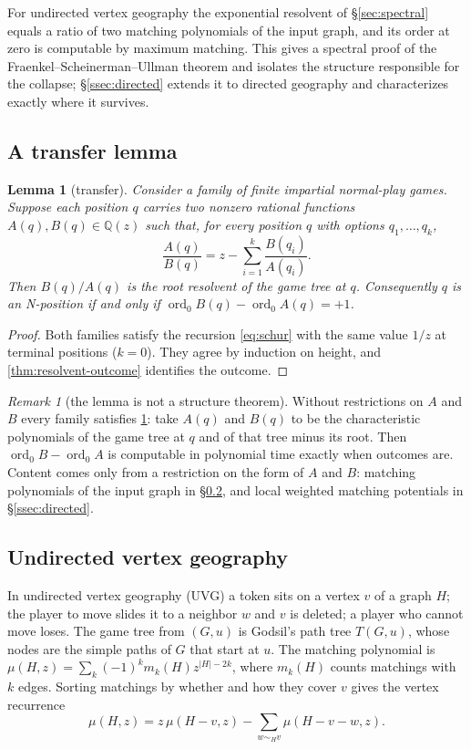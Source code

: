 \documentclass[11pt]{amsart}
\theoremstyle{plain}
\newtheorem{lemma}[theorem]{Lemma}
\theoremstyle{definition}
\theoremstyle{remark}
\newtheorem*{remark*}{Remark}
\numberwithin{equation}{section}
\newcommand{\QQ}{\mathbb{Q}}
\newcommand{\Qz}{\QQ(z)}
\newcommand{\ord}{\operatorname{ord}}
\begin{document}
For undirected vertex geography the exponential resolvent of \S\ref{sec:spectral} equals a ratio of two matching polynomials of the input graph, and its order at zero is computable by maximum matching. This gives a spectral proof of the Fraenkel--Scheinerman--Ullman theorem and isolates the structure responsible for the collapse; \S\ref{ssec:directed} extends it to directed geography and characterizes exactly where it survives.

\subsection{A transfer lemma}
\begin{lemma}[transfer]\label{lem:transfer}
Consider a family of finite impartial normal-play games. Suppose each position $q$ carries two nonzero rational functions $A(q),B(q)\in\Qz$ such that, for every position $q$ with options $q_1,\dots,q_k$,
\[
\frac{A(q)}{B(q)}=z-\sum_{i=1}^k\frac{B(q_i)}{A(q_i)}.
\]
Then $B(q)/A(q)$ is the root resolvent of the game tree at $q$. Consequently $q$ is an N-position if and only if $\ord_0B(q)-\ord_0A(q)=+1$.
\end{lemma}
\begin{proof}
Both families satisfy the recursion \eqref{eq:schur} with the same value $1/z$ at terminal positions ($k=0$). They agree by induction on height, and \cref{thm:resolvent-outcome} identifies the outcome.
\end{proof}

\begin{remark*}[the lemma is not a structure theorem]
Without restrictions on $A$ and $B$ every family satisfies \cref{lem:transfer}: take $A(q)$ and $B(q)$ to be the characteristic polynomials of the game tree at $q$ and of that tree minus its root. Then $\ord_0B-\ord_0A$ is computable in polynomial time exactly when outcomes are. Content comes only from a restriction on the form of $A$ and $B$: matching polynomials of the input graph in \S\ref{ssec:uvg}, and local weighted matching potentials in \S\ref{ssec:directed}.
\end{remark*}

\subsection{Undirected vertex geography}\label{ssec:uvg}
In undirected vertex geography (UVG) a token sits on a vertex $v$ of a graph $H$; the player to move slides it to a neighbor $w$ and $v$ is deleted; a player who cannot move loses. The game tree from $(G,u)$ is Godsil's path tree $T(G,u)$, whose nodes are the simple paths of $G$ that start at $u$. The matching polynomial is $\mu(H,z)=\sum_k(-1)^km_k(H)z^{|H|-2k}$, where $m_k(H)$ counts matchings with $k$ edges. Sorting matchings by whether and how they cover $v$ gives the vertex recurrence
\begin{equation}\label{eq:vertex-recurrence}
\mu(H,z)=z\,\mu(H-v,z)-\sum_{w\sim_Hv}\mu(H-v-w,z).
\end{equation}
\end{document}

